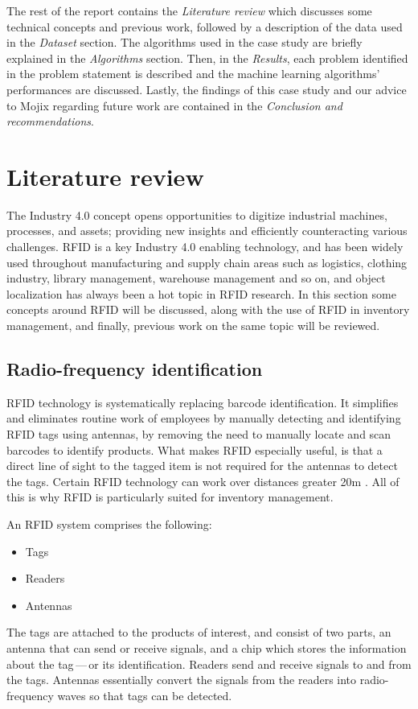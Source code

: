 \documentclass{article}
\begin{document}
The rest of the report contains the \emph{Literature review} which discusses some technical concepts and previous work, followed by a description of the data used in the \emph{Dataset} section.
The algorithms used in the case study are briefly explained in the \emph{Algorithms} section.
Then, in the \emph{Results}, each problem identified in the problem statement is described and the machine learning algorithms' performances are discussed.
Lastly, the findings of this case study and our advice to Mojix regarding future work are contained in the \emph{Conclusion and recommendations}.

\section{Literature review}

The Industry 4.0 concept opens opportunities to digitize industrial machines, processes, and assets; providing new insights and efficiently counteracting various challenges. 
\ac{RFID} is a key Industry 4.0 enabling technology, and has been widely used throughout manufacturing and supply chain areas such as logistics, clothing industry, library management, warehouse management and so on, and object localization has always been a hot topic in \ac{RFID} research. 
In this section some concepts around \ac{RFID} will be discussed, along with the use of \ac{RFID} in inventory management, and finally, previous work on the same topic will be reviewed.

\subsection{Radio-frequency identification}

\ac{RFID} technology is systematically replacing barcode identification.
It simplifies and eliminates routine work of employees by manually detecting and identifying \ac{RFID} tags using antennas, by removing the need to manually locate and scan barcodes to identify products.
What makes \ac{RFID} especially useful, is that a direct line of sight to the tagged item is not required for the antennas to detect the tags.
Certain \ac{RFID} technology can work over distances greater 20m \citep{ref:about_rfid}.
All of this is why \ac{RFID} is particularly suited for inventory management.

An \ac{RFID} system comprises the following:
\begin{itemize}
    \item Tags
    \item Readers
    \item Antennas
\end{itemize}
The tags are attached to the products of interest, and consist of two parts, an antenna that can send or receive signals, and a chip which stores the information about the tag\,---\,or its identification.
Readers send and receive signals to and from the tags.
Antennas essentially convert the signals from the readers into radio-frequency waves so that tags can be detected\citep{ref:about_rfid}.
\end{document}
